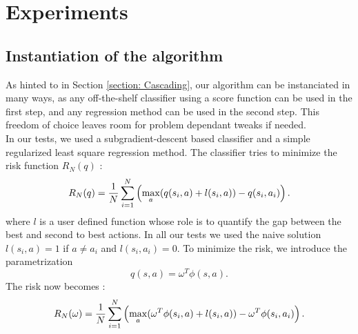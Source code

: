\documentclass{article} %
\newcommand{\0}{\mathbf{0}}
\newcommand{\1}{\mathbf{1}}
\begin{document}
\section{Experiments}
\label{section: experiments}
\subsection{Instantiation of the algorithm}
As hinted to in Section \ref{section: Cascading}, our algorithm can be instanciated in many ways, as any off-the-shelf classifier using a score function can be used in the first step, and any regression method can be used in the second step. This freedom of choice leaves room for problem dependant tweaks if needed.\\

In our tests, we used a subgradient-descent based classifier and a simple regularized least square regression method. The classifier tries to minimize the risk function $R_N(q)$ :
\begin{equation}
  R_N(q) = {1\over N} \sum_{i=1}^N\left(\max_{a}(q(s_i,a) + l(s_i,a)) - q(s_i,a_i) \right).
\end{equation}
where $l$ is a user defined function whose role is to quantify the gap between the best and second to best actions. In all our tests we used the naive solution $l(s_i,a) = 1$ if $a\neq a_i$ and $l(s_i,a_i) = 0$. To minimize the risk, we introduce the parametrization 
\begin{equation}
  q(s,a) = \omega^T\phi(s,a).
\end{equation}
The risk now becomes :
\begin{equation}
  R_N(\omega) = {1\over N} \sum_{i=1}^N\left(\max_{a}(\omega^T\phi(s_i,a) + l(s_i,a)) - \omega^T\phi(s_i,a_i) \right).
\end{equation}
\end{document}
